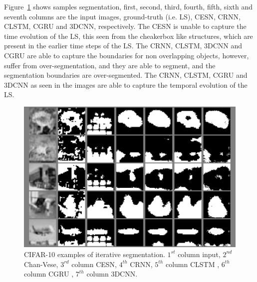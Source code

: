 \documentclass{WitsPhysicsReport}
\begin{document}
\begin{table}[H]
\centering
\caption{CIFAR-10 testing results. Here we compare various models and noise is also included.}
    \label{tab:cifar_10}
\end{table}

Figure~\ref{fig:sample_results_cifar10} shows samples segmentation, first, second, third, fourth, fifth, sixth and seventh columns are the input images, ground-truth (i.e. LS), CESN, CRNN, CLSTM, CGRU and 3DCNN, respectively. The CESN is unable to capture the time evolution of the LS, this seen from the cheakerbox like structures, which are present in the earlier time steps of the LS. The CRNN, CLSTM, 3DCNN and CGRU are able to capture the boundaries for non overlapping objects, however, suffer from over-segmentation, and they are able to segment, and the segmentation boundaries are over-segmented. The CRNN, CLSTM, CGRU and 3DCNN as seen in the images are able to capture the temporal evolution of the LS.

\begin{figure}[H]
\centering
  \includegraphics[width=1\linewidth]{Figure/Results/CIFAR_10_sample.png}
  \caption{CIFAR-10 examples of iterative segmentation. $1^{st}$ column input, $2^{nd}$ Chan-Vese, $3^{rd}$ column CESN, $4^{th}$ CRNN, $5^{th}$ column CLSTM , $6^{th}$ column CGRU , $7^{th}$ column 3DCNN.}
 \label{fig:sample_results_cifar10}
\end{figure}
\end{document}
